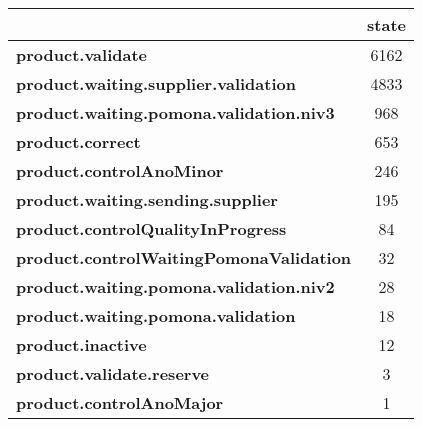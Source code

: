 \begin{tabular}{lc}
\toprule
{} &  state \\
\midrule
\textbf{product.validate                      } &   6162 \\
\textbf{product.waiting.supplier.validation   } &   4833 \\
\textbf{product.waiting.pomona.validation.niv3} &    968 \\
\textbf{product.correct                       } &    653 \\
\textbf{product.controlAnoMinor               } &    246 \\
\textbf{product.waiting.sending.supplier      } &    195 \\
\textbf{product.controlQualityInProgress      } &     84 \\
\textbf{product.controlWaitingPomonaValidation} &     32 \\
\textbf{product.waiting.pomona.validation.niv2} &     28 \\
\textbf{product.waiting.pomona.validation     } &     18 \\
\textbf{product.inactive                      } &     12 \\
\textbf{product.validate.reserve              } &      3 \\
\textbf{product.controlAnoMajor               } &      1 \\
\bottomrule
\end{tabular}
